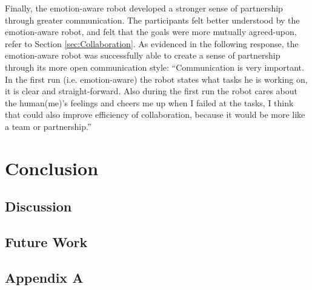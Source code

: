 \documentclass[12pt]{report}
\begin{document}
Finally, the emotion-aware robot developed a stronger sense of  partnership
through greater communication. The participants felt better understood by the
emotion-aware robot, and felt that the goals were more mutually agreed-upon,
refer to Section \ref{sec:Collaboration}. As evidenced in the following
response, the emotion-aware robot was successfully able to create a sense of
partnership through its more open communication style: ``Communication is very
important. In the first run (i.e. emotion-aware) the robot states what tasks he
is working on, it is clear and straight-forward. Also during the first run the
robot cares about the human(me)'s feelings and cheers me up when I failed at the
tasks, I think that could also improve efficiency of collaboration, because it
would be more like a team or partnership.''

\chapter{Conclusion}
\label{ch:conclusion}

\section{Discussion}

\section{Future Work}

\pagebreak





\begin{appendices}
\chapter*{Appendix A}
\label{apdx:constraints}

\end{appendices}
\end{document}
